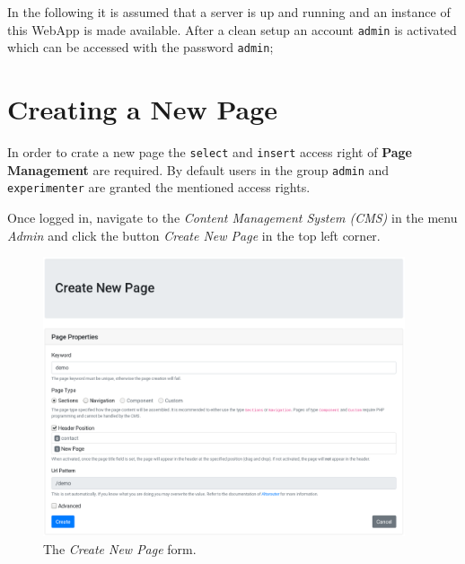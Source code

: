 \documentclass[a4paper,oneside]{book}
\begin{document}
In the following it is assumed that a server is up and running and an instance of this WebApp is made available.
After a clean setup an account \texttt{admin} is activated which can be accessed with the password \texttt{admin};

\chapter{Creating a New Page}
\label{sec.new_page}
In order to crate a new page the \texttt{select} and \texttt{insert} access right of \textbf{Page Management} are required.
By default users in the group \texttt{admin} and \texttt{experimenter} are granted the mentioned access rights.

Once logged in, navigate to the \emph{Content Management System (CMS)} in the menu \emph{Admin} and click the button \emph{Create New Page} in the top left corner.

\begin{figure}[ht]
    \centering
    \includegraphics[width=0.95\textwidth]{create_page.png}
    \caption{The \emph{Create New Page} form.}
    \label{fig.create_page}
\end{figure}
\end{document}
